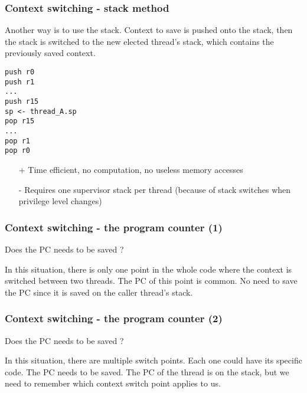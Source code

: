 \begin{frame}[containsverbatim]
  \frametitle{Context switching - stack method}

  Another way is to use the stack. Context to save is pushed onto the
  stack, then the stack is switched to the new elected thread's stack,
  which contains the previously saved context.

  \begin{verbatim}
push r0
push r1
...
push r15
sp <- thread_A.sp
pop r15
...
pop r1
pop r0
  \end{verbatim}

  \begin{itemize}
  \item[+]
    Time efficient, no computation, no useless memory accesses
  \item[-]
    Requires one supervisor stack per thread (because of stack
    switches when privilege level changes)
  \end{itemize}

\end{frame}


\begin{frame}[containsverbatim]
  \frametitle{Context switching - the program counter (1)}

  Does the PC needs to be saved ?

  \begin{center}
  \end{center}

  In this situation, there is only one point in the whole code where
  the context is switched between two threads. The PC of this point is
  common. No need to save the PC since it is saved on the caller
  thread's stack.

\end{frame}


\begin{frame}[containsverbatim]
  \frametitle{Context switching - the program counter (2)}

  Does the PC needs to be saved ?

  \begin{center}
  \end{center}

  In this situation, there are multiple switch points. Each one could
  have its specific code. The PC needs to be saved. The PC of the
  thread is on the stack, but we need to remember which context switch
  point applies to us.

\end{frame}

